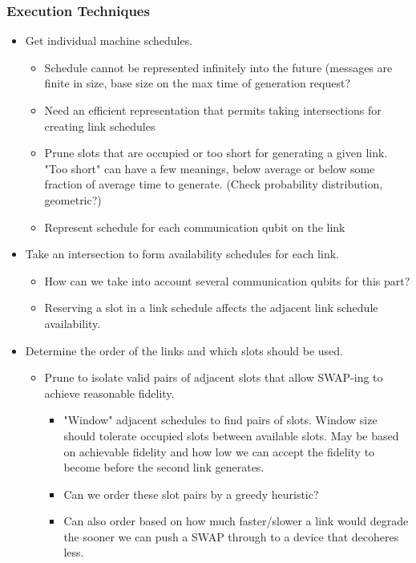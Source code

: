 \documentclass{article}
\begin{document}
\subsubsection{Execution Techniques}
\begin{itemize}
    \item Get individual machine schedules.
    \begin{itemize}
        \item Schedule cannot be represented infinitely into the future (messages are finite in size, base size on the max time of generation request?
        \item Need an efficient representation that permits taking intersections for creating link schedules
        \item Prune slots that are occupied or too short for generating a given link.  "Too short" can have a few meanings, below average or below some fraction of average time to generate. (Check probability distribution, geometric?)
        \item Represent schedule for each communication qubit on the link
    \end{itemize}
    \item Take an intersection to form availability schedules for each link.
    \begin{itemize}
        \item How can we take into account several communication qubits for this part?
        \item Reserving a slot in a link schedule affects the adjacent link schedule availability.
    \end{itemize}
    \item Determine the order of the links and which slots should be used.
    \begin{itemize}
        \item Prune to isolate valid pairs of adjacent slots that allow SWAP-ing to achieve reasonable fidelity.
        \begin{itemize}
            \item "Window" adjacent schedules to find pairs of slots.  Window size should tolerate occupied slots between available slots.  May be based on achievable fidelity and how low we can accept the fidelity to become before the second link generates.
            \item Can we order these slot pairs by a greedy heuristic?
            \item Can also order based on how much faster/slower a link would degrade the sooner we can push a SWAP through to a device that decoheres less.

\end{itemize}
\end{itemize}
\end{itemize}
\end{document}
